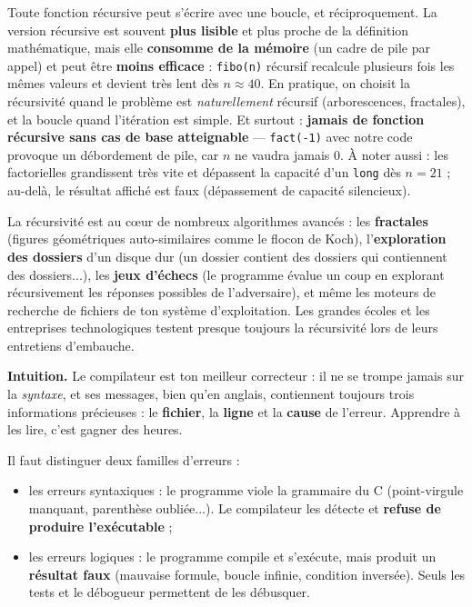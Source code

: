 \documentclass[11pt]{article}
\newcommand{\cle}[1]{{\popxbold\color{popdark}#1}}
\newcounter{popsec}
\newcounter{popsub}
\newcommand{\courssub}[1]{%
  \stepcounter{popsub}%
  \par\vspace{9pt}\noindent{\popxbold\fontsize{11.5}{13}\selectfont\color{popink}{\color{poporange}\thepopsec.\thepopsub}\hspace{6pt}#1}\par\nopagebreak\vspace{4pt}
}
\begin{document}
\begin{attention}
Toute fonction récursive peut s'écrire avec une boucle, et réciproquement. La version récursive est souvent \textbf{plus lisible} et plus proche de la définition mathématique, mais elle \textbf{consomme de la mémoire} (un cadre de pile par appel) et peut être \textbf{moins efficace} : \texttt{fibo(n)} récursif recalcule plusieurs fois les mêmes valeurs et devient très lent dès $n \approx 40$. En pratique, on choisit la récursivité quand le problème est \emph{naturellement} récursif (arborescences, fractales), et la boucle quand l'itération est simple. Et surtout : \textbf{jamais de fonction récursive sans cas de base atteignable} — \texttt{fact(-1)} avec notre code provoque un débordement de pile, car $n$ ne vaudra jamais $0$. À noter aussi : les factorielles grandissent très vite et dépassent la capacité d'un \texttt{long} dès $n = 21$ ; au-delà, le résultat affiché est faux (dépassement de capacité silencieux).
\end{attention}

\begin{savaistu}
La récursivité est au cœur de nombreux algorithmes avancés : les \textbf{fractales} (figures géométriques auto-similaires comme le flocon de Koch), l'\textbf{exploration des dossiers} d'un disque dur (un dossier contient des dossiers qui contiennent des dossiers...), les \textbf{jeux d'échecs} (le programme évalue un coup en explorant récursivement les réponses possibles de l'adversaire), et même les moteurs de recherche de fichiers de ton système d'exploitation. Les grandes écoles et les entreprises technologiques testent presque toujours la récursivité lors de leurs entretiens d'embauche.
\end{savaistu}

\courssub{Gestion des erreurs de compilation}

\textbf{Intuition.} Le compilateur est ton meilleur correcteur : il ne se trompe jamais sur la \emph{syntaxe}, et ses messages, bien qu'en anglais, contiennent toujours trois informations précieuses : le \textbf{fichier}, la \textbf{ligne} et la \textbf{cause} de l'erreur. Apprendre à les lire, c'est gagner des heures.

Il faut distinguer deux familles d'erreurs :
\begin{itemize}
\item les \cle{erreurs syntaxiques} : le programme viole la grammaire du C (point-virgule manquant, parenthèse oubliée...). Le compilateur les détecte et \textbf{refuse de produire l'exécutable} ;
\item les \cle{erreurs logiques} : le programme compile et s'exécute, mais produit un \textbf{résultat faux} (mauvaise formule, boucle infinie, condition inversée). Seuls les tests et le débogueur permettent de les débusquer.
\end{itemize}
\end{document}
